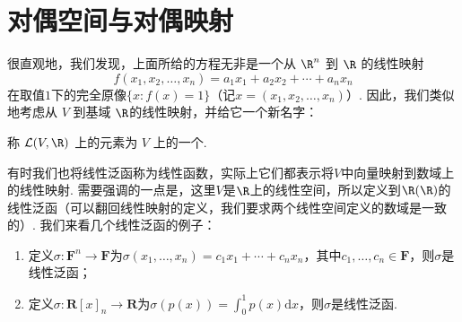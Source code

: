 






\section{对偶空间与对偶映射}

很直观地，我们发现，上面所给的方程无非是一个从 $\R^n$ 到 $\R$ 的线性映射
\[f(x_1, x_2, \ldots, x_n) = a_1 x_1 + a_2 x_2 + \cdots + a_n x_n\]
在取值$1$下的完全原像$\{x: f(x) = 1\}$（记$x=(x_1,x_2,\ldots,x_n)$）. 因此，我们类似地考虑从 $V$ 到基域 $\R$的线性映射，并给它一个新名字：

\begin{definition}{}{}
    称 $\mathcal{L}(V, \R)$ 上的元素为 $V$ 上的一个.
\end{definition}
有时我们也将线性泛函称为线性函数，实际上它们都表示将$V$中向量映射到数域上的线性映射. 需要强调的一点是，这里$V$是$\R$上的线性空间，所以定义到$\R(\R)$的线性泛函（可以翻回线性映射的定义，我们要求两个线性空间定义的数域是一致的）. 我们来看几个线性泛函的例子：
\begin{enumerate}
    \item 定义$\sigma:\mathbf{F}^n\to\mathbf{F}$为$\sigma(x_1,\ldots,x_n)=c_1x_1+\cdots+c_nx_n$，其中$c_1,\ldots,c_n\in\mathbf{F}$，则$\sigma$是线性泛函；

    \item 定义$\sigma:\mathbf{R}[x]_n\to\mathbf{R}$为$\sigma(p(x))=\displaystyle\int_0^1p(x)\mathrm{d}x$，则$\sigma$是线性泛函.
\end{enumerate}

